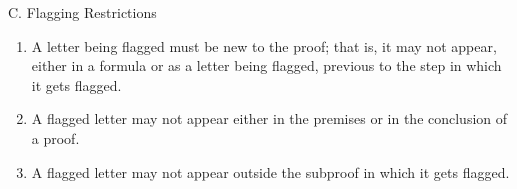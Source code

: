 \documentclass[12pt]{article}
\begin{document}
C. Flagging Restrictions\\
\begin{enumerate}
\item A letter being flagged must be new to the proof; that is, it may not appear, either in a formula or as a letter being flagged, previous to the step in which it gets flagged.
\item A flagged letter may not appear either in the premises or in the conclusion of a proof.
\item A flagged letter may not appear outside the subproof in which it gets flagged.
\end{enumerate}

\newpage

\newpage

\end{document}
